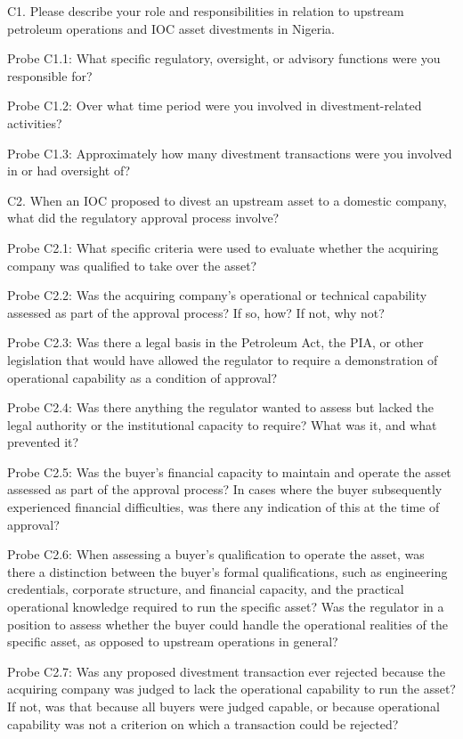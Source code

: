 \documentclass[twoside,fontset=lmodern]{mitthesis}
\begin{document}
C1. Please describe your role and responsibilities in relation to
upstream petroleum operations and IOC asset divestments in Nigeria.

Probe C1.1: What specific regulatory, oversight, or advisory functions
were you responsible for?

Probe C1.2: Over what time period were you involved in
divestment-related activities?

Probe C1.3: Approximately how many divestment transactions were you
involved in or had oversight of?

C2. When an IOC proposed to divest an upstream asset to a domestic
company, what did the regulatory approval process involve?

Probe C2.1: What specific criteria were used to evaluate whether the
acquiring company was qualified to take over the asset?

Probe C2.2: Was the acquiring company's operational or technical
capability assessed as part of the approval process? If so, how? If not,
why not?

Probe C2.3: Was there a legal basis in the Petroleum Act, the PIA, or
other legislation that would have allowed the regulator to require a
demonstration of operational capability as a condition of approval?

Probe C2.4: Was there anything the regulator wanted to assess but lacked
the legal authority or the institutional capacity to require? What was
it, and what prevented it?

Probe C2.5: Was the buyer's financial capacity to maintain and operate
the asset assessed as part of the approval process? In cases where the
buyer subsequently experienced financial difficulties, was there any
indication of this at the time of approval?

Probe C2.6: When assessing a buyer's qualification to operate the asset,
was there a distinction between the buyer's formal qualifications, such
as engineering credentials, corporate structure, and financial capacity,
and the practical operational knowledge required to run the specific
asset? Was the regulator in a position to assess whether the buyer could
handle the operational realities of the specific asset, as opposed to
upstream operations in general?

Probe C2.7: Was any proposed divestment transaction ever rejected
because the acquiring company was judged to lack the operational
capability to run the asset? If not, was that because all buyers were
judged capable, or because operational capability was not a criterion on
which a transaction could be rejected?
\end{document}
